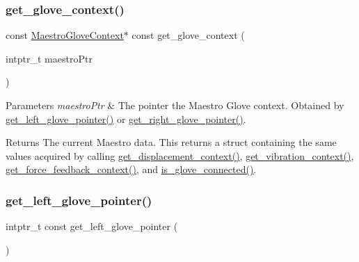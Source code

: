 \subsubsection{\texorpdfstring{get\+\_\+glove\+\_\+context()}{get\_glove\_context()}}
{\footnotesize\ttfamily const \hyperlink{struct_maestro_glove_context}{Maestro\+Glove\+Context}$\ast$ const get\+\_\+glove\+\_\+context (\begin{DoxyParamCaption}\item[{intptr\+\_\+t}]{maestro\+Ptr }\end{DoxyParamCaption})}


\begin{DoxyParams}{Parameters}
{\em maestro\+Ptr} & The pointer the Maestro Glove context. Obtained by \hyperlink{group__glove_management_ga63ce3c99d4a8b8db851b22af9185764e}{get\+\_\+left\+\_\+glove\+\_\+pointer()} or \hyperlink{group__glove_management_ga9b8fd9d91aeac3f8da50f7a7eba0c32b}{get\+\_\+right\+\_\+glove\+\_\+pointer()}. \\
\hline
\end{DoxyParams}
\begin{DoxyReturn}{Returns}
The current Maestro data. This returns a struct containing the same values acquired by calling {\ttfamily \hyperlink{group__displacement_access_ga26563f1c104bd9a0d80ab8c0afd1e8bd}{get\+\_\+displacement\+\_\+context()}}, {\ttfamily \hyperlink{group__vibration_control_ga578e2f96e86827fd32c9e8e181cf4c64}{get\+\_\+vibration\+\_\+context()}}, {\ttfamily \hyperlink{group__force_feedback_control_ga6017d2145085cfc8f6d455a29006a640}{get\+\_\+force\+\_\+feedback\+\_\+context()}}, and {\ttfamily \hyperlink{group__glove_management_ga85666868951331c5266df7559abeefbc}{is\+\_\+glove\+\_\+connected()}}. 
\end{DoxyReturn}
\mbox{\label{group__glove_management_ga63ce3c99d4a8b8db851b22af9185764e}} 
\subsubsection{\texorpdfstring{get\+\_\+left\+\_\+glove\+\_\+pointer()}{get\_left\_glove\_pointer()}}
{\footnotesize\ttfamily intptr\+\_\+t const get\+\_\+left\+\_\+glove\+\_\+pointer (\begin{DoxyParamCaption}{ }\end{DoxyParamCaption})}

